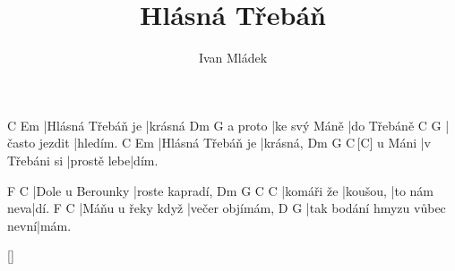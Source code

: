 \documentclass{song}
\title{Hlásná Třebáň}
\author{Ivan Mládek}
\begin{document}
C                 Em
|Hlásná Třebáň je |krásná
        Dm           G\7
a proto |ke svý Máně |do Třebáně
C             G\7
|často jezdit |hledím.
C                 Em
|Hlásná Třebáň je |krásná,
       Dm            G\7         C\,[C\7]
u Máni |v Třebáni si |prostě lebe|dím.
\endstrophe
 
\strophe
F                C
|Dole u Berounky |roste kapradí,
Dm         G\7      C           C\7
|komáři že |koušou, |to nám neva|dí.
F                 C
|Máňu u řeky když |večer objímám,
D\7                          G
|tak bodání hmyzu vůbec nevní|mám.
\endstrophe
 

\ref{}
\end{document}
